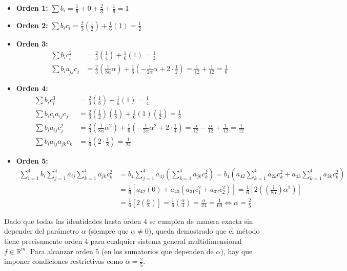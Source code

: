 \begin{sol}
\begin{itemize}
    \item \textbf{Orden 1:} $\sum b_i = \frac{1}{6} + 0 + \frac{2}{3} + \frac{1}{6} = 1$
    \item \textbf{Orden 2:} $\sum b_i c_i = \frac{2}{3}\left(\frac{1}{2}\right) + \frac{1}{6}(1) = \frac{1}{2}$
    \item \textbf{Orden 3:} 
    \begin{align*}
        \sum b_i c_i^2 &= \frac{2}{3}\left(\frac{1}{4}\right) + \frac{1}{6}(1) = \frac{1}{3} \\
        \sum b_i a_{ij} c_j &= \frac{2}{3}\left(\frac{1}{8\alpha} \alpha\right) + \frac{1}{6}\left(-\frac{1}{2\alpha} \alpha + 2 \cdot \frac{1}{2}\right) = \frac{1}{12} + \frac{1}{12} = \frac{1}{6}
    \end{align*}
    \item \textbf{Orden 4:}
    \begin{align*}
        \sum b_i c_i^3 &= \frac{2}{3}\left(\frac{1}{8}\right) + \frac{1}{6}(1) = \frac{1}{4} \\
        \sum b_i c_i a_{ij} c_j &= \frac{2}{3}\left(\frac{1}{2}\right)\left(\frac{1}{8}\right) + \frac{1}{6}(1)\left(\frac{1}{2}\right) = \frac{1}{8} \\
        \sum b_i a_{ij} c_j^2 &= \frac{2}{3}\left(\frac{1}{8\alpha} \alpha^2\right) + \frac{1}{6}\left(-\frac{1}{2\alpha} \alpha^2 + 2 \cdot \frac{1}{4}\right) = \frac{\alpha}{12} - \frac{\alpha}{12} + \frac{1}{12} = \frac{1}{12} \\
        \sum b_i a_{ij} a_{jk} c_k &= \frac{1}{6}\left(2 \cdot \frac{1}{8}\right) = \frac{1}{24}
    \end{align*}
    \item \textbf{Orden 5:}
    \begin{align*} 
        \sum_{i=1}^4 b_i \sum_{j=1}^4 a_{ij} \sum_{k=1}^4 a_{jk} c_k^2 &= b_4 \sum_{j=1}^4 a_{4j} \left( \sum_{k=1}^4 a_{jk} c_k^2 \right) = b_4 \left( a_{42} \sum_{k=1}^4 a_{2k} c_k^2 + a_{43} \sum_{k=1}^4 a_{3k} c_k^2 \right) \\ 
        &= \frac{1}{6} \left[ a_{42}(0) + a_{43} \left( a_{31} c_1^2 + a_{32} c_2^2 \right) \right] = \frac{1}{6} \left[ 2 \left( \left(\frac{1}{8\alpha}\right) \alpha^2 \right) \right] \\
        &= \frac{1}{6} \left[ 2 \left( \frac{\alpha}{8} \right) \right] = \frac{1}{6} \left( \frac{\alpha}{4} \right) = \frac{\alpha}{24} = \frac{1}{60} \iff \alpha=\frac{2}{5} 
    \end{align*}
\end{itemize}
Dado que todas las identidades hasta orden 4 se cumplen de manera exacta sin depender del parámetro $\alpha$ (siempre que $\alpha \neq 0$), queda demostrado que el método tiene precisamente orden 4 para cualquier sistema general multidimensional $f \in \mathbb{R}^m$. Para alcanzar orden 5 (en los sumatorios que dependen de $\alpha$), hay que imponer condiciones restrictivas como $\alpha = \frac{2}{5}$.
\end{sol}
